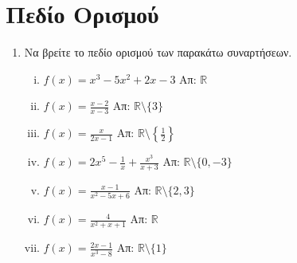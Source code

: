 



\everymath{\displaystyle}

\pagestyle{askhseis}




\begin{center}
  \minibox{\large\bfseries \textcolor{Col1}{Ασκήσεις στις Συναρτήσεις}}
\end{center}

\vspace{\baselineskip}

\section*{Πεδίο Ορισμού}

\begin{enumerate}
  \item  Να βρείτε το πεδίο ορισμού των παρακάτω συναρτήσεων.
    \begin{enumerate}[i)]
      \item $ f(x) = x^{3} - 5x^{2} + 2x -3 $ \hfill Απ: $ \mathbb{R} $
      \item $ f(x) = \frac{x-2}{x-3} $ \hfill Απ: $ \mathbb{R} \setminus 
        \{ 3 \} $ 
      \item $ f(x) = \frac{x}{2x-1} $ \hfill Απ: 
        $ \mathbb{R} \setminus \left\{ \frac{1}{2} \right\} $ 
      \item $ f(x) = 2x^{5} - \frac{1}{x} + \frac{x^{3}}{x+3}  $ \hfill 
        Απ: $ \mathbb{R} \setminus \{ 0, -3 \} $
      \item $ f(x) = \frac{x-1}{x^{2} - 5x + 6} $ \hfill Απ: 
        $ \mathbb{R} \setminus \{ 2,3 \}  $ 
      \item $ f(x) = \frac{4}{x^{2}+x+1} $ \hfill Απ: $ \mathbb{R} $ 
      \item $ f(x) = \frac{2x-1}{x^{3}-8} $ \hfill Απ: 
        $ \mathbb{R} \setminus \{ 1 \}  $ 
    \end{enumerate}


\end{enumerate}
